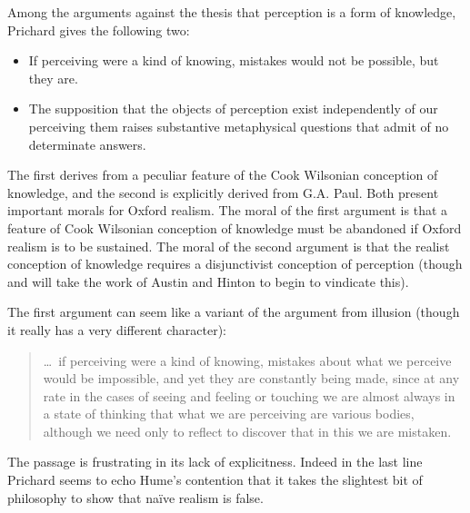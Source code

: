 \documentclass[11pt]{article}
\begin{document}
Among the arguments against the thesis that perception is a form of knowledge, Prichard gives the following two:
\begin{itemize}
	\item If perceiving were a kind of knowing, mistakes would not be possible, but they are.
	\item The supposition that the objects of perception exist independently of our perceiving them raises substantive metaphysical questions that admit of no determinate answers.
\end{itemize}
The first derives from a peculiar feature of the Cook Wilsonian conception of knowledge, and the second is explicitly derived from G.A. Paul. Both present important morals for Oxford realism. The moral of the first argument is that a feature of Cook Wilsonian conception of knowledge must be abandoned if Oxford realism is to be sustained. The moral of the second argument is that the realist conception of knowledge requires a disjunctivist conception of perception (though and will take the work of Austin and Hinton to begin to vindicate this).

The first argument can seem like a variant of the argument from illusion (though it really has a very different character): 
\begin{quote}
	\ldots\ if perceiving were a kind of knowing, mistakes about what we perceive would be impossible, and yet they are constantly being made, since at any rate in the cases of seeing and feeling or touching we are almost always in a state of thinking that what we are perceiving are various bodies, although we need only to reflect to discover that in this we are mistaken. 
\end{quote}
The passage is frustrating in its lack of explicitness. Indeed in the last line Prichard seems to echo Hume’s contention that it takes the slightest bit of philosophy to show that naïve realism is false. 
\end{document}
